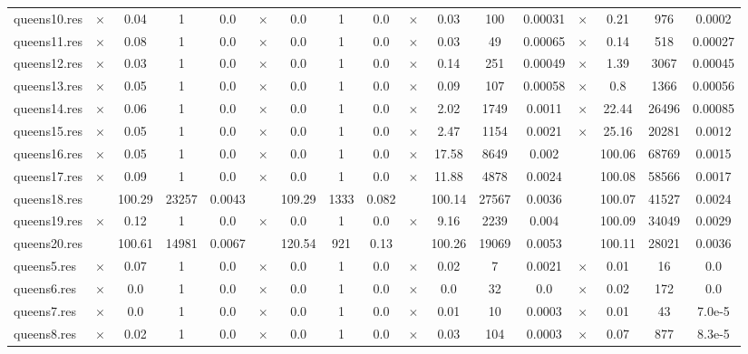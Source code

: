 \documentclass[main.tex]{subfiles}
\begin{document}
\begin{landscape}
\begin{center}
\begin{tabular}{|l|cccc|cccc|cccc|cccc|}
queens10.res & $\times$ & 0.04 & 1 & 0.0
 & $\times$ & 0.0 & 1 & 0.0
 & $\times$ & 0.03 & 100 & 0.00031
 & $\times$ & 0.21 & 976 & 0.0002
\\
queens11.res & $\times$ & 0.08 & 1 & 0.0
 & $\times$ & 0.0 & 1 & 0.0
 & $\times$ & 0.03 & 49 & 0.00065
 & $\times$ & 0.14 & 518 & 0.00027
\\
queens12.res & $\times$ & 0.03 & 1 & 0.0
 & $\times$ & 0.0 & 1 & 0.0
 & $\times$ & 0.14 & 251 & 0.00049
 & $\times$ & 1.39 & 3067 & 0.00045
\\
queens13.res & $\times$ & 0.05 & 1 & 0.0
 & $\times$ & 0.0 & 1 & 0.0
 & $\times$ & 0.09 & 107 & 0.00058
 & $\times$ & 0.8 & 1366 & 0.00056
\\
queens14.res & $\times$ & 0.06 & 1 & 0.0
 & $\times$ & 0.0 & 1 & 0.0
 & $\times$ & 2.02 & 1749 & 0.0011
 & $\times$ & 22.44 & 26496 & 0.00085
\\
queens15.res & $\times$ & 0.05 & 1 & 0.0
 & $\times$ & 0.0 & 1 & 0.0
 & $\times$ & 2.47 & 1154 & 0.0021
 & $\times$ & 25.16 & 20281 & 0.0012
\\
queens16.res & $\times$ & 0.05 & 1 & 0.0
 & $\times$ & 0.0 & 1 & 0.0
 & $\times$ & 17.58 & 8649 & 0.002
 &  & 100.06 & 68769 & 0.0015
\\
queens17.res & $\times$ & 0.09 & 1 & 0.0
 & $\times$ & 0.0 & 1 & 0.0
 & $\times$ & 11.88 & 4878 & 0.0024
 &  & 100.08 & 58566 & 0.0017
\\
queens18.res &  & 100.29 & 23257 & 0.0043
 &  & 109.29 & 1333 & 0.082
 &  & 100.14 & 27567 & 0.0036
 &  & 100.07 & 41527 & 0.0024
\\
queens19.res & $\times$ & 0.12 & 1 & 0.0
 & $\times$ & 0.0 & 1 & 0.0
 & $\times$ & 9.16 & 2239 & 0.004
 &  & 100.09 & 34049 & 0.0029
\\
queens20.res &  & 100.61 & 14981 & 0.0067
 &  & 120.54 & 921 & 0.13
 &  & 100.26 & 19069 & 0.0053
 &  & 100.11 & 28021 & 0.0036
\\
queens5.res & $\times$ & 0.07 & 1 & 0.0
 & $\times$ & 0.0 & 1 & 0.0
 & $\times$ & 0.02 & 7 & 0.0021
 & $\times$ & 0.01 & 16 & 0.0
\\
queens6.res & $\times$ & 0.0 & 1 & 0.0
 & $\times$ & 0.0 & 1 & 0.0
 & $\times$ & 0.0 & 32 & 0.0
 & $\times$ & 0.02 & 172 & 0.0
\\
queens7.res & $\times$ & 0.0 & 1 & 0.0
 & $\times$ & 0.0 & 1 & 0.0
 & $\times$ & 0.01 & 10 & 0.0003
 & $\times$ & 0.01 & 43 & 7.0e-5
\\
queens8.res & $\times$ & 0.02 & 1 & 0.0
 & $\times$ & 0.0 & 1 & 0.0
 & $\times$ & 0.03 & 104 & 0.0003
 & $\times$ & 0.07 & 877 & 8.3e-5

\end{tabular}
\end{center}
\end{landscape}
\end{document}
